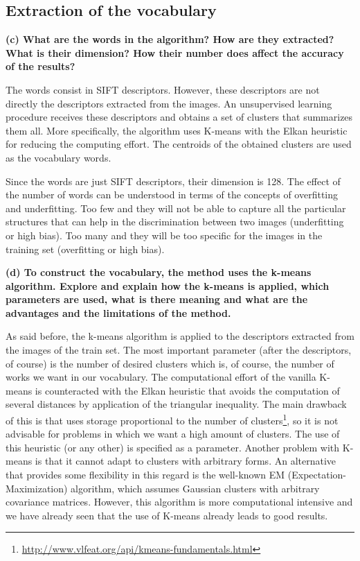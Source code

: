 \subsection{Extraction of the vocabulary}

{\bfseries (c) What are the words in the algorithm? How are they extracted? What is their dimension? How their number does affect the accuracy of the results?}

The words consist in SIFT descriptors. However, these descriptors are not directly the descriptors extracted from the images. An unsupervised learning procedure receives these descriptors and obtains a set of clusters that summarizes them all. More specifically, the algorithm uses K-means with the Elkan heuristic for reducing the computing effort. The centroids of the obtained clusters are used as the vocabulary words.

Since the words are just SIFT descriptors, their dimension is 128. The effect of the number of words can be understood in terms of the concepts of overfitting and underfitting. Too few and they will not be able to capture all the particular structures that can help in the discrimination between two images (underfitting or high bias). Too many and they will be too specific for the images in the training set (overfitting or high bias).

{\bfseries (d) To construct the vocabulary, the method uses the k-means algorithm. Explore and explain how the k-means is applied, which parameters are used, what is there meaning and what are the advantages and the limitations of the method.}

As said before, the k-means algorithm is applied to the descriptors extracted from the images of the train set. The most important parameter (after the descriptors, of course) is the number of desired clusters which is, of course, the number of works we want in our vocabulary. The computational effort of the vanilla K-means is counteracted with the Elkan heuristic that avoids the computation of several distances by application of the triangular inequality. The main drawback of this is that uses storage proportional to the number of clusters\footnote{\url{http://www.vlfeat.org/api/kmeans-fundamentals.html}}, so it is not advisable for problems in which we want a high amount of clusters. The use of this heuristic (or any other) is specified as a parameter. Another problem with K-means is that it cannot adapt to clusters with arbitrary forms. An alternative that provides some flexibility in this regard is the well-known EM (Expectation-Maximization) algorithm, which assumes Gaussian clusters with arbitrary covariance matrices. However, this algorithm is more computational intensive and we have already seen that the use of K-means already leads to good results.

